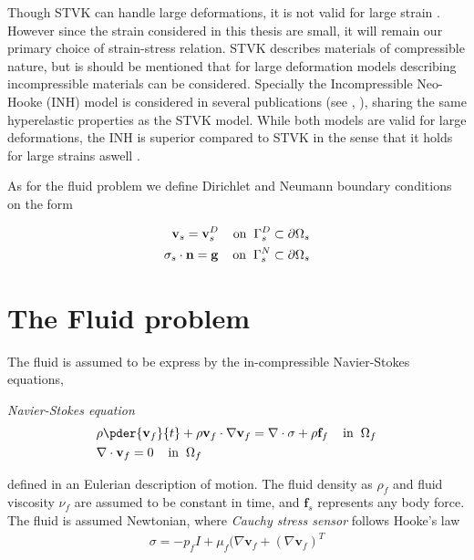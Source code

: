 Though STVK can handle large deformations, it is not valid for large strain \cite{Razzaq2010}. However since the strain considered in this thesis are small, it will remain our primary choice of strain-stress relation.  STVK describes materials of compressible nature,  but is should be mentioned that for large deformation models describing incompressible materials can be considered. Specially the Incompressible Neo-Hooke (INH) model is considered in several publications (see \cite{Wick2013}, \cite{Richter2010c}), sharing the same hyperelastic properties as the STVK model. While both models are valid for large deformations, the INH is superior compared to STVK in the sense that it holds for large strains aswell \cite{Razzaq2010}. \newpage

As for the fluid problem we define Dirichlet and Neumann boundary conditions on the form

\begin{align*}
\mathbf{v}_s = \mathbf{v}_s^D 
\hspace{4mm} \text{on} \hspace{2mm} \Gamma_s^D \subset \partial \Omega_s  \\
\sigma_s \cdot \mathbf{n} = \mathbf{g}  
\hspace{4mm} \text{on} \hspace{2mm} \Gamma_s^N \subset \partial \Omega_s 
\end{align*}


\section{The Fluid problem}
The fluid is assumed to be express by the in-compressible Navier-Stokes equations,
\begin{equat}
\textit{Navier-Stokes equation}
\begin{align}
&\rho \pder{\mathbf{v}_f}{t} + \rho \mathbf{v}_f \cdot \nabla \mathbf{v}_f =
\nabla \cdot \sigma + \rho \mathbf{f}_f \hspace{4mm} \text{in} \hspace{2mm} \Omega_f \\
&\nabla \cdot \mathbf{v}_f = 0 \hspace{4mm} \text{in} \hspace{2mm} \Omega_f 
\end{align} 
\end{equat}
defined in an Eulerian description of motion. The fluid density as $\rho_f$ and fluid viscosity $\nu_f$  are assumed to be constant in time, and $\mathbf{f}_s$ represents any body force. 
The fluid is assumed Newtonian, where \textit{Cauchy stress sensor} follows Hooke's law
\begin{align*}
\sigma = -p_f I + \mu_f (\nabla \mathbf{v}_f + (\nabla \mathbf{v}_f)^T
\end{align*}

